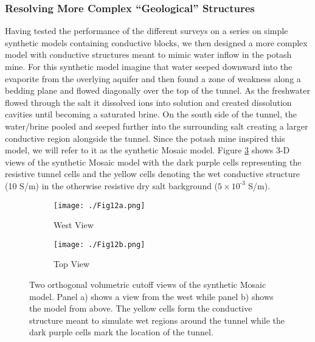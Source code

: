 \documentclass[preprint,authoryear,12pt]{elsarticle}
\begin{document}
\subsubsection{Resolving More Complex ``Geological'' Structures}
\label{sec:RingArray_Development_Straight_Synth_GeologicalTarget}

Having tested the performance of the different surveys on a series on simple synthetic models containing conductive blocks, we then designed a more complex model with conductive structures meant to mimic water inflow in the potash mine. For this synthetic model imagine that water seeped downward into the evaporite from the overlying aquifer and then found a zone of weakness along a bedding plane and flowed diagonally over the top of the tunnel. As the freshwater flowed through the salt it dissolved ions into solution and created dissolution cavities until becoming a saturated brine. On the south side of the tunnel, the water/brine pooled and seeped further into the surrounding salt creating a larger conductive region alongside the tunnel. Since the potash mine inspired this model, we will refer to it as the synthetic Mosaic model.  Figure \ref{fig:StraightTunnel_SynthMosaic2_TrueMod} shows 3-D views of the synthetic Mosaic model with the dark purple cells representing the resistive tunnel cells and the yellow cells denoting the wet conductive structure (10 S/m) in the otherwise resistive dry salt background ($5 \times 10^{\text{-3}}$ S/m).


\begin{figure}[htp]{}
   \begin{center}
      \begin{subfigure}{0.54\linewidth}
         \texttt{[image: ./Fig12a.png]}
         \caption{West View}
         \label{fig:StraightTunnel_SynthMosaic2_TrueMod_West}
      \end{subfigure}
      \hspace{-2.5cm}
      \qquad
      \begin{subfigure}{0.54\linewidth}
         \texttt{[image: ./Fig12b.png]}
         \caption{Top View}
         \label{fig:StraightTunnel_SynthMosaic2_TrueMod_Top}
      \end{subfigure}
   \end{center}
\vspace{-0.4cm}
\caption{Two orthogonal volumetric cutoff views of the synthetic Mosaic model. Panel a) shows a view from the west while panel b) shows the model from above. The yellow cells form the conductive structure meant to simulate wet regions around the tunnel while the dark purple cells mark the location of the tunnel.}
\label{fig:StraightTunnel_SynthMosaic2_TrueMod}
\end{figure}
\end{document}
